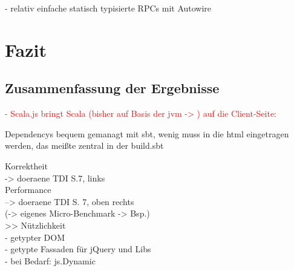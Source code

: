 \documentclass[a4paper, 12pt, hidelinks, listof=totoc, listoftables=totoc, bibliography=totoc]{scrreprt}
\newcommand{\TODO}[1]{\textcolor{red}{#1}\newline}
\begin{document}
- relativ einfache statisch typisierte RPCs mit Autowire




\chapter{Fazit}\label{chap:conclusion}

 \section{Zusammenfassung der Ergebnisse}


\TODO{- Scala.js bringt Scala (bisher auf Basis der jvm -> %
) auf die Client-Seite:}


Dependencys bequem gemanagt mit sbt, wenig muss in die html eingetragen werden, das meißte zentral in der build.sbt


   Korrektheit \\
	-> doeraene TDI S.7, links \\
   Performance \\
	--> doeraene TDI S. 7, oben rechts \\
	(-> eigenes Micro-Benchmark -> Bsp.) \\
>> Nützlichkeit \\
	- getypter \ac{DOM} \\
	- getypte Fassaden für jQuery und Libs \\
	- bei Bedarf: js.Dynamic \\
\end{document}
